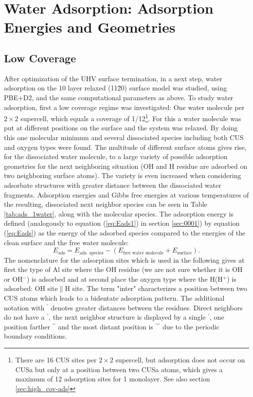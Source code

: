 \documentclass[11pt,DIV=13,BCOR=5mm,a4paper,headinclude]{scrbook}
\begin{document}
\section{Water Adsorption: Adsorption Energies and Geometries}\label{structure_search11-20}
\subsection{Low Coverage}
After optimization of the UHV surface termination, in a next step, water adsorption on the 10 layer relaxed (11\=20) surface model was studied, using PBE+D2, and the same computational parameters as above.
To study water adsorption, first a low coverage regime was investigated: One water molecule per $2\times 2$ supercell, which equals a coverage of 1/12\footnote{There are 16 CUS sites per $2\times 2$ supercell, but adsorption does not occur on CUSa but only at a position between two CUSa atoms, which gives a maximum of 12 adsorption sites for 1 monolayer. See also section \ref{sec:high_cov-ads}}.
For this a water molecule was put at different positions on the surface and the system was relaxed.
By doing this one molecular minimum and several dissociated species including both CUS and oxygen types were found.
The multitude of different surface atoms gives rise, for the dissociated water molecule, to a large variety of possible adsorption geometries for the next neighboring situation (OH and H residue are adsorbed on two neighboring surface atoms).
The variety is even increased when considering adsorbate structures with greater distance between the dissociated water fragments.
Adsorption energies and Gibbs free energies at various temperatures of the resulting, dissociated next neighbor species can be seen in Table \ref{tab:ads_1water}, along with the molecular species.
The adsorption energy is defined (analogously to equation (\ref{eq:Eads1}) in section \ref{sec:0001}) by equation (\ref{eq:Eads}) as the energy of the adsorbed species compared to the energies of the clean surface and the free water molecule:
\begin{equation}\label{eq:Eads}
 E_\textrm{ads}=E_\textrm{ads. species}-(E_\text{free water molecule}+E_\text{surface}).
\end{equation}
The nomenclature for the adsorption sites which is used in the following gives at first the type of Al site where the OH residue (we are not sure whether it is OH or OH$^-$) is adsorbed and at second place the oxygen type where the H(H$^+$) is adsorbed: OH site$\parallel$H site.
The term "inter" characterizes a position between two CUS atoms which leads to a bidentate adsorption pattern.
The additional notation with $^\prime$ denotes greater distances between the residues.
Direct neighbors do not have a $^\prime$, the next neighbor structure is displayed by a single $^\prime$, one position farther $^{\prime\prime}$ and the most distant position is $^{\prime\prime\prime}$ due to the periodic boundary conditions.
\end{document}

